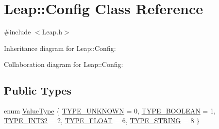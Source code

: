 \hypertarget{class_leap_1_1_config}{}\section{Leap\+:\+:Config Class Reference}
\label{class_leap_1_1_config}


{\ttfamily \#include $<$Leap.\+h$>$}



Inheritance diagram for Leap\+:\+:Config\+:


Collaboration diagram for Leap\+:\+:Config\+:
\subsection*{Public Types}
\begin{DoxyCompactItemize}
\item 
enum \hyperlink{class_leap_1_1_config_aee9819af7eacacc324aa72619310a9d8}{Value\+Type} \{ \newline
\hyperlink{class_leap_1_1_config_aee9819af7eacacc324aa72619310a9d8a61027e87139ecf1153e7b7f41fd9adfa}{T\+Y\+P\+E\+\_\+\+U\+N\+K\+N\+O\+WN} = 0, 
\hyperlink{class_leap_1_1_config_aee9819af7eacacc324aa72619310a9d8a592e8eabddb7d95b192fee923c423760}{T\+Y\+P\+E\+\_\+\+B\+O\+O\+L\+E\+AN} = 1, 
\hyperlink{class_leap_1_1_config_aee9819af7eacacc324aa72619310a9d8af552faf6063e26e0b5a995c344cfaebd}{T\+Y\+P\+E\+\_\+\+I\+N\+T32} = 2, 
\hyperlink{class_leap_1_1_config_aee9819af7eacacc324aa72619310a9d8a85ccbf5a55972697b350b394f7d87cfa}{T\+Y\+P\+E\+\_\+\+F\+L\+O\+AT} = 6, 
\newline
\hyperlink{class_leap_1_1_config_aee9819af7eacacc324aa72619310a9d8a312ad72cfe51163b2817732f7530e04e}{T\+Y\+P\+E\+\_\+\+S\+T\+R\+I\+NG} = 8
 \}
\end{DoxyCompactItemize}
